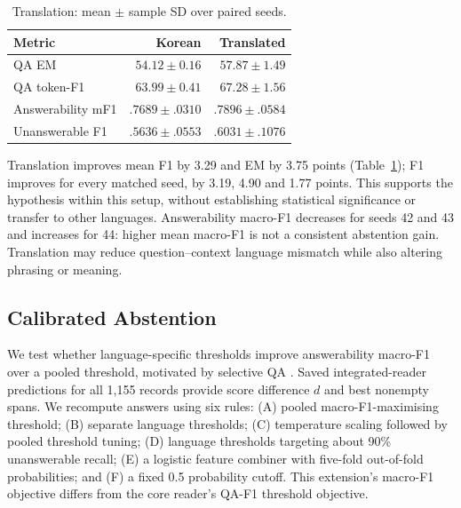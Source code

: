 \documentclass[11pt]{article}
\begin{document}
\begin{table}[t]
\centering\small
\begin{tabular}{lrr}
\toprule
Metric & Korean & Translated\\
\midrule
QA EM & $54.12\pm0.16$ & $57.87\pm1.49$\\
QA token-F1 & $63.99\pm0.41$ & $67.28\pm1.56$\\
Answerability mF1 & $.7689\pm.0310$ & $.7896\pm.0584$\\
Unanswerable F1 & $.5636\pm.0553$ & $.6031\pm.1076$\\
\bottomrule
\end{tabular}
\caption{Translation: mean $\pm$ sample SD over paired seeds.}
\label{tab:translation}
\end{table}
Translation improves mean F1 by 3.29 and EM by 3.75 points (Table~\ref{tab:translation}); F1 improves for every matched seed, by 3.19, 4.90 and 1.77 points. This supports the hypothesis within this setup, without establishing statistical significance or transfer to other languages. Answerability macro-F1 decreases for seeds 42 and 43 and increases for 44: higher mean macro-F1 is not a consistent abstention gain. Translation may reduce question--context language mismatch while also altering phrasing or meaning.

\subsection{Calibrated Abstention}
We test whether language-specific thresholds improve answerability macro-F1 over a pooled threshold, motivated by selective QA \citep{selective}. Saved integrated-reader predictions for all 1,155 records provide score difference $d$ and best nonempty spans. We recompute answers using six rules: (A) pooled macro-F1-maximising threshold; (B) separate language thresholds; (C) temperature scaling followed by pooled threshold tuning; (D) language thresholds targeting about 90\% unanswerable recall; (E) a logistic feature combiner with five-fold out-of-fold probabilities; and (F) a fixed 0.5 probability cutoff. This extension's macro-F1 objective differs from the core reader's QA-F1 threshold objective.
\end{document}
